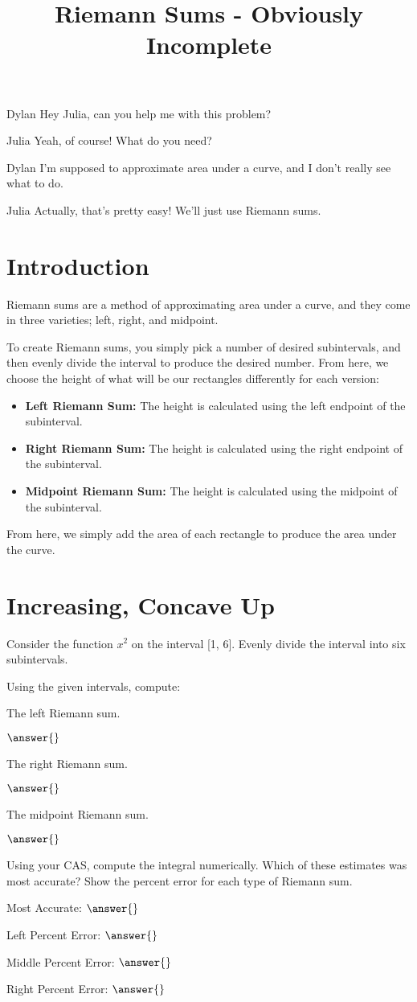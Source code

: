\documentclass{ximera}
\title{Riemann Sums - Obviously Incomplete}
\begin{document}
\maketitle
\begin{dialogue}
\item[Dylan] Hey Julia, can you help me with this problem?
\item[Julia] Yeah, of course! What do you need?
\item[Dylan] I'm supposed to approximate area under a curve, and I don't really see what to do.
\item[Julia] Actually, that's pretty easy! We'll just use Riemann sums.
\end{dialogue}

\section{Introduction}
Riemann sums are a method of approximating area under a curve, and they come in three varieties; left, right, and midpoint.

To create Riemann sums, you simply pick a number of desired subintervals, and then evenly divide the interval to produce the desired number. From here, we choose the height of what will be our rectangles differently for each version:
\begin{itemize}
\item{\textbf{Left Riemann Sum:} The height is calculated using the left endpoint of the subinterval.}
\item{\textbf{Right Riemann Sum:} The height is calculated using the right endpoint of the subinterval.}
\item{\textbf{Midpoint Riemann Sum:} The height is calculated using the midpoint of the subinterval.}
\end{itemize}

From here, we simply add the area of each rectangle to produce the area under the curve.

\section{Increasing, Concave Up}
Consider the function $x^2$ on the interval [1, 6]. Evenly divide the interval into six subintervals.
\begin{question}
Using the given intervals, compute:

The left Riemann sum.

$\answer{}$

The right Riemann sum.

$\answer{}$

The midpoint Riemann sum.

$\answer{}$

Using your CAS, compute the integral numerically. Which of these estimates was most accurate? Show the percent error for each type of Riemann sum.

Most Accurate: $\answer{}$

Left Percent Error: $\answer{}$

Middle Percent Error: $\answer{}$

Right Percent Error: $\answer{}$
\end{question}
\end{document}
